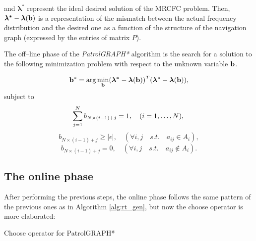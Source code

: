 and $\bm{\lambda^*}$ represent the ideal desired solution of the MRCFC problem. Then, ${\bm{\lambda^*} - \bm{\lambda}({\bf{b}})}$ is a representation of the mismatch between the actual frequency distribution and the desired one as a function of the structure of the navigation graph (expressed by the entries of matrix $P$). 

The off--line phase of the \textit{PatrolGRAPH*} algorithm is the search for a solution to the following minimization problem with respect to the unknown variable ${\bf{b}}$.


\begin{equation}
{\bf{b^*}} = \arg \min_{{\bf{b}}}({\bm{\lambda^*} - \bm{\lambda}({\bf{b}})})^T ({\bm{\lambda^*} - \bm{\lambda}({\bf{b}})}),
\label{ths3}
\end{equation}
\indent subject to
\begin{equation}
\sum\limits_{j=1}^{N} {b_{N\times(i-1)+j} } = 1, \quad (i=1,\ldots,N), \\
\label{con3a}
\end{equation}
\begin{equation}
b_{N\times(i-1)+j} \ge  |\epsilon |,\quad (\forall i,j\quad s.t.\quad a_{ij} \in A_i),  
\label{con3b}
\end{equation}
\begin{equation}
b_{N\times(i-1)+j} = 0,\quad (\forall i,j\quad s.t.\quad a_{ij} \notin A_i). 
\label{con3c}
\end{equation}


\subsection{The online phase}
After performing the previous steps, the online phase follows the same pattern of the previous ones as in Algorithm \ref{alg:rt_gen}, but now the choose operator is more elaborated:

\begin{algorithm}
\begin{algorithmic}[1]
 \label{a:PG_upd_cv}
	\label{a:PG_deltaP}
\ENDFOR
{}\label{a:PG_find_min}
\label{a:PG_upd_k}
\end{algorithmic}
\caption{Choose operator for PatrolGRAPH*}\label{alg:rt_pg}
\end{algorithm}

